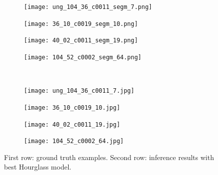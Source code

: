 \begin{figure}
\centering
\begin{subfigure}{.19\textwidth}
\centering
  \texttt{[image: ung\_104\_36\_c0011\_segm\_7.png]}
\end{subfigure}
\begin{subfigure}{.19\textwidth}
  \centering
  \texttt{[image: 36\_10\_c0019\_segm\_10.png]}
\end{subfigure}
\begin{subfigure}{.19\textwidth}
  \centering
  \texttt{[image: 40\_02\_c0011\_segm\_19.png]}
\end{subfigure}
\begin{subfigure}{.19\textwidth}
  \centering
  \texttt{[image: 104\_52\_c0002\_segm\_64.png]}\\
\end{subfigure}\\
\begin{subfigure}{.198\textwidth}
\centering
  \texttt{[image: ung\_104\_36\_c0011\_7.jpg]}
\end{subfigure}%
\begin{subfigure}{.19\textwidth}
  \centering
  \texttt{[image: 36\_10\_c0019\_10.jpg]}
\end{subfigure}
\begin{subfigure}{.19\textwidth}
  \centering
  \texttt{[image: 40\_02\_c0011\_19.jpg]}
\end{subfigure}
\begin{subfigure}{.189\textwidth}
  \centering
  \texttt{[image: 104\_52\_c0002\_64.jpg]}
\end{subfigure}

\caption{First row: ground truth examples. Second row: inference results with best Hourglass model.}
\label{hourglass:inference}
\end{figure}

